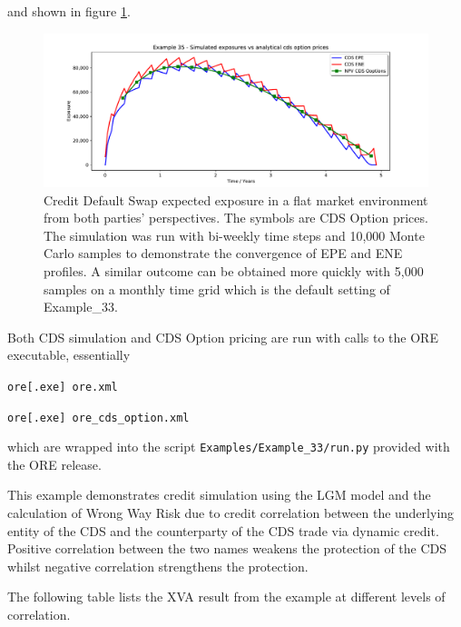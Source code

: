 \documentclass[12pt, a4paper]{article}
\begin{document}
{and shown in figure \ref{fig_33}. 
\begin{figure}[h!]
\begin{center}
\includegraphics[scale=0.45]{mpl_cds_33_2w_10k.pdf}
\end{center}
\caption{Credit Default Swap expected exposure in a flat market environment from both parties' perspectives. The symbols are CDS Option prices. The simulation was run with bi-weekly time steps and 10,000 Monte Carlo samples to demonstrate the convergence of EPE and ENE profiles. A similar
outcome can be obtained more quickly with 5,000 samples on a monthly time grid which is the default setting of Example\_33. }
\label{fig_33}
\end{figure}
Both CDS simulation and CDS Option pricing are run with calls to the ORE executable, essentially 

\medskip
\centerline{\tt ore[.exe] ore.xml} 

\centerline{\tt ore[.exe] ore\_cds\_option.xml} 
\medskip

which are wrapped into the script {\tt Examples/Example\_33/run.py} provided with the ORE release.

This example demonstrates credit simulation using the LGM model and the calculation of Wrong Way Risk due to credit
correlation between the underlying entity of the CDS and the counterparty of the CDS trade via dynamic credit.
Positive correlation between the two names weakens the protection of the CDS whilst
negative correlation strengthens the protection.

The following table lists the XVA result from the example at different levels of correlation.


}
\end{document}
